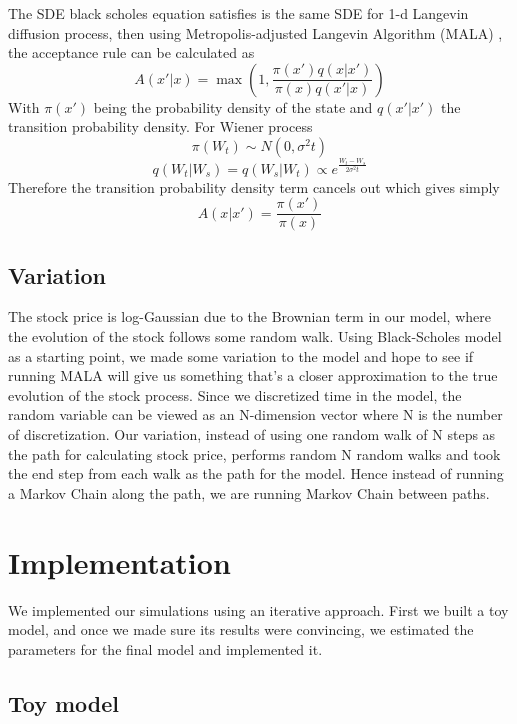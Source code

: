 \documentclass[%
 reprint,
 amsmath,amssymb,
 aps,
 nofootinbib,
 showpacs
]{revtex4-1}
\begin{document}
The SDE black scholes equation satisfies is the same SDE for 1-d Langevin diffusion process, then using Metropolis-adjusted Langevin Algorithm (MALA) \cite{mala}, the acceptance rule can be calculated as
\begin{equation}
A(x'|x) = \max\left(1,\frac{\pi(x')q(x|x')}{\pi(x)q(x'|x)}\right)
\end{equation}
With $\pi(x')$ being the probability density of the state and $q(x'|x')$ the transition probability density.
For Wiener process
\[
\pi(W_t) \sim N(0,\sigma^2t)
\]
\[
q(W_t|W_s)=q(W_s|W_t) \propto e^{\frac{W_t-W_s}{2\sigma^2 t}}
\]
Therefore the transition probability density term cancels out which gives simply
\begin{equation}
A(x|x') = \frac{\pi(x')}{\pi(x)}
\end{equation}

\subsection*{Variation}

The stock price is log-Gaussian due to the Brownian term in our model, where the evolution of the stock follows some random walk.
Using Black-Scholes model as a starting point, we made some variation to the model and hope to see if running MALA will give us something that's a closer approximation to the true evolution of the stock process.
Since we discretized time in the model, the random variable can be viewed as an N-dimension vector where N is the number of discretization.
Our variation, instead of using one random walk of N steps as the path for calculating stock price, performs random N random walks and took the end step from each walk as the path for the model.
Hence instead of running a Markov Chain along the path, we are running Markov Chain between paths.

\section{\label{sec:implementation}Implementation}

We implemented our simulations using an iterative approach.
First we built a toy model, and once we made sure its results were convincing, we estimated the parameters for the final model and implemented it.

\subsection{Toy model}
\end{document}
